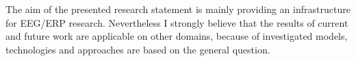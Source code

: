 \documentclass[a4paper, 10pt]{article}
\begin{document}
The aim of the presented research statement is mainly providing an infrastructure for EEG/ERP research. Nevertheless I strongly believe that the results of current and future work are applicable on other domains, because of investigated models, technologies and approaches are based on the general question.



{}

\end{document}
